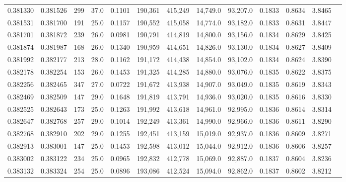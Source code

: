 \begin{tabular}{rrrrrrrrrrrrr}
0.381330 & 0.381526 &   299 & 37.0 &                                     0.1101 & 190,361 & 415,249 &  14,749.0 &  93,207.0 & 0.1833 & 0.8634 & 3.8465 \\
0.381531 & 0.381700 &   191 & 25.0 &                                     0.1157 & 190,552 & 415,058 &  14,774.0 &  93,182.0 & 0.1833 & 0.8631 & 3.8447 \\
0.381701 & 0.381872 &   239 & 26.0 &                                     0.0981 & 190,791 & 414,819 &  14,800.0 &  93,156.0 & 0.1834 & 0.8629 & 3.8425 \\
0.381874 & 0.381987 &   168 & 26.0 &                                     0.1340 & 190,959 & 414,651 &  14,826.0 &  93,130.0 & 0.1834 & 0.8627 & 3.8409 \\
0.381992 & 0.382177 &   213 & 28.0 &                                     0.1162 & 191,172 & 414,438 &  14,854.0 &  93,102.0 & 0.1834 & 0.8624 & 3.8390 \\
0.382178 & 0.382254 &   153 & 26.0 &                                     0.1453 & 191,325 & 414,285 &  14,880.0 &  93,076.0 & 0.1835 & 0.8622 & 3.8375 \\
0.382256 & 0.382465 &   347 & 27.0 &                                     0.0722 & 191,672 & 413,938 &  14,907.0 &  93,049.0 & 0.1835 & 0.8619 & 3.8343 \\
0.382469 & 0.382509 &   147 & 29.0 &                                     0.1648 & 191,819 & 413,791 &  14,936.0 &  93,020.0 & 0.1835 & 0.8616 & 3.8330 \\
0.382525 & 0.382643 &   173 & 25.0 &                                     0.1263 & 191,992 & 413,618 &  14,961.0 &  92,995.0 & 0.1836 & 0.8614 & 3.8314 \\
0.382647 & 0.382768 &   257 & 29.0 &                                     0.1014 & 192,249 & 413,361 &  14,990.0 &  92,966.0 & 0.1836 & 0.8611 & 3.8290 \\
0.382768 & 0.382910 &   202 & 29.0 &                                     0.1255 & 192,451 & 413,159 &  15,019.0 &  92,937.0 & 0.1836 & 0.8609 & 3.8271 \\
0.382913 & 0.383001 &   147 & 25.0 &                                     0.1453 & 192,598 & 413,012 &  15,044.0 &  92,912.0 & 0.1836 & 0.8606 & 3.8257 \\
0.383002 & 0.383122 &   234 & 25.0 &                                     0.0965 & 192,832 & 412,778 &  15,069.0 &  92,887.0 & 0.1837 & 0.8604 & 3.8236 \\
0.383132 & 0.383324 &   254 & 25.0 &                                     0.0896 & 193,086 & 412,524 &  15,094.0 &  92,862.0 & 0.1837 & 0.8602 & 3.8212 \\

\end{tabular}
